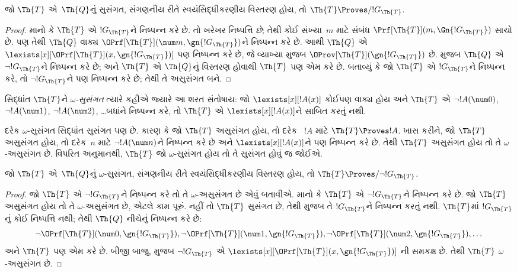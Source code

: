 \begin{lem}
જો $\Th{T}$ એ~$\Th{Q}$નું
સુસંગત,
સંગણનીય રીતે સ્વયંસિદ્ધીકરણીય વિસ્તરણ
હોય, તો
$\Th{T} \Proves/ !G_\Th{T}$.
\end{lem}

\begin{proof}
માનો કે $\Th{T}$ એ
$!G_\Th{T}$ને નિષ્પન્ન
કરે છે. તો ખરેખર
નિષ્પત્તિ \emph{છે};
તેથી કોઈ સંખ્યા~$m$ માટે
સંબંધ $\Prf[\Th{T}](m,
\Gn{!G_\Th{T}})$ સાચો છે.
પણ તેથી $\Th{Q}$ વાક્ય
$\OPrf[\Th{T}](\num m, \gn{!G_\Th{T}})$ને
નિષ્પન્ન કરે છે.
આથી $\Th{Q}$ એ
$\lexists[x][\OPrf[\Th{T}](x,\gn{!G_\Th{T}})]$
પણ નિષ્પન્ન કરે છે,
જે વ્યાખ્યા મુજબ
$\OProv[\Th{T}](\gn{!G_\Th{T}})$
છે. 
મુજબ $\Th{Q}$ એ
$\lnot !G_\Th{T}$ને
નિષ્પન્ન કરે છે;
અને $\Th{T}$ એ
$\Th{Q}$નું વિસ્તરણ
હોવાથી $\Th{T}$ પણ
એમ કરે છે. બતાવ્યું કે
જો $\Th{T}$ એ
$!G_\Th{T}$ને નિષ્પન્ન
કરે, તો $\lnot !G_\Th{T}$ને
પણ નિષ્પન્ન કરે છે;
તેથી તે અસુસંગત બને.
\end{proof}

\begin{defn}
સિદ્ધાંત $\Th{T}$ને
\emph{$\omega$-સુસંગત}
ત્યારે કહીએ જ્યારે આ
શરત સંતોષાય: જો
$\lexists[x][!A(x)]$
કોઈપણ વાક્ય હોય અને
$\Th{T}$ એ
$\lnot
!A(\num 0)$,
$\lnot !A(\num 1)$,
$\lnot !A(\num 2)$,
\dots બધાંને
નિષ્પન્ન કરે,
તો $\Th{T}$ એ
$\lexists[x][!A(x)]$ને
સાબિત કરતું નથી.
\end{defn}

દરેક $\omega$-સુસંગત
સિદ્ધાંત સુસંગત પણ છે.
કારણ કે જો $\Th{T}$
અસુસંગત હોય, તો દરેક
~$!A$ માટે
$\Th{T} \Proves !A$.
ખાસ કરીને, જો
$\Th{T}$ અસુસંગત હોય,
તો દરેક~$n$ માટે
$\lnot !A(\num n)$ને
નિષ્પન્ન કરે છે અને
$\lexists[x][!A(x)]$ને
પણ નિષ્પન્ન કરે છે.
તેથી $\Th{T}$ અસુસંગત
હોય તો તે
$\omega$-અસુસંગત છે.
વિપરિત અનુમાનથી,
$\Th{T}$ જો
$\omega$-સુસંગત હોય
તો તે સુસંગત હોવું જ
જોઈએ.

\begin{lem}
જો $\Th{T}$ એ~$\Th{Q}$નું
$\omega$-સુસંગત,
સંગણનીય રીતે સ્વયંસિદ્ધીકરણીય વિસ્તરણ
હોય, તો
$\Th{T} \Proves/ \lnot !G_\Th{T}$.
\end{lem}

\begin{proof}
જો $\Th{T}$ એ
$\lnot !G_\Th{T}$ને
નિષ્પન્ન કરે તો તે
$\omega$-અસુસંગત છે
એવું બતાવીએ. માનો કે
$\Th{T}$ એ
$\lnot !G_\Th{T}$ને
નિષ્પન્ન કરે છે.
જો $\Th{T}$ અસુસંગત
હોય તો તે
$\omega$-અસુસંગત છે,
એટલે કામ પૂરું.
નહીં તો $\Th{T}$
સુસંગત છે, તેથી
મુજબ તે $!G_\Th{T}$ને
નિષ્પન્ન કરતું નથી.
$\Th{T}$માં
$!G_\Th{T}$નું
કોઈ નિષ્પત્તિ નથી;
તેથી $\Th{Q}$ નીચેનું
નિષ્પન્ન કરે છે:
\[
\lnot \OPrf[\Th{T}](\num 0, \gn{!G_\Th{T}}), \lnot \OPrf[\Th{T}](\num 1,
\gn{!G_\Th{T}}), \lnot \OPrf[\Th{T}](\num 2, \gn{!G_\Th{T}}), \dots
\]
અને $\Th{T}$ પણ એમ
કરે છે. બીજી બાજુ,
 મુજબ
$\lnot
!G_\Th{T}$ એ
$\lexists[x][\OPrf[\Th{T}](x,\gn{!G_\Th{T}})]$
ની સમકક્ષ છે. તેથી
$\Th{T}$
$\omega$-અસુસંગત છે.
\end{proof}

